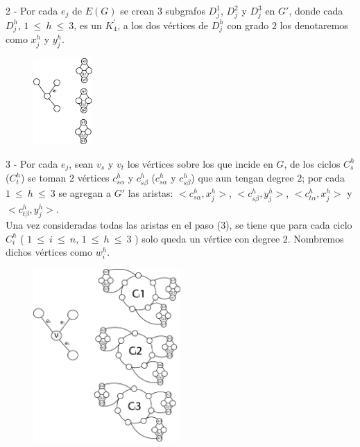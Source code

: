 \documentclass{article}
\begin{document}
2 - Por cada $e_j$ de $E(G)$ se crean $3$ subgrafos $D_{j}^1$, $D_{j}^2$ y $D_{j}^3$ en $G'$, donde cada $D_{j}^h$, $1~ \leq~h~\leq ~3$,  es un $K^{'}_4$, a los dos v\'ertices 
de $D_{j}^h$ con grado $2$ los denotaremos como $x_{j}^h$ y $y_{j}^h$.\\
\begin{figure}
    \centering
    \includegraphics[width= 0.2\textwidth ]{img2.png}
\end{figure}


3 - Por cada $e_j$, sean $v_s$ y $v_t$ los v\'ertices sobre los que incide en $G$, de los ciclos $C_s^h$ ($C_t^h$) se toman $2$ v\'ertices 
$c_{s\alpha}^h$ y $c_{s\beta}^h$ ($c_{s\alpha}^h$ y $c_{s\beta}^h$) que aun tengan degree $2$; por cada $1~\leq ~h ~\leq~ 3$ se agregan a $G'$ las aristas: $<c_{s\alpha}^h, x_{j}^h>$, $<c_{s\beta}^h, y_{j}^h>$, 
$<c_{t\alpha}^h, x_{j}^h>$ y $<c_{t\beta}^h, y_{j}^h>$.\\ 

Una vez consideradas todas las aristas en el paso (3), se tiene que para cada ciclo $C_i^h$ ( $1~\leq ~i ~\leq~ n$, $1~\leq ~h ~\leq~ 3$ )
solo queda un v\'ertice con degree $2$. Nombremos dichos v\'ertices como $w_i^h$.\\ 
\begin{figure}[!h]
    \centering
    \includegraphics[width= 0.5\textwidth ]{img3.png}
\end{figure}
\end{document}
